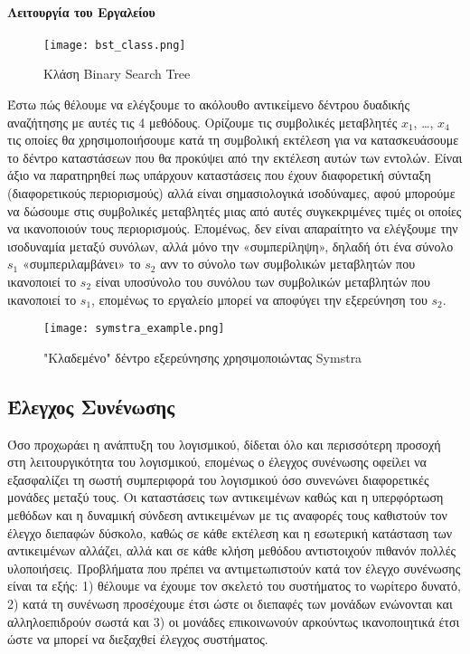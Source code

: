 \documentclass[12pt]{article}
\begin{document}
\paragraph{Λειτουργία του Εργαλείου}

\begin{wrapfigure}{r}{0.45\textwidth}
\centering
    \texttt{[image: bst\_class.png]}
    \caption{Κλάση Binary Search Tree}
    \label{fig:bst}
\end{wrapfigure}


Έστω πώς θέλουμε να ελέγξουμε το ακόλουθο αντικείμενο δέντρου δυαδικής αναζήτησης με αυτές τις 4 μεθόδους. Ορίζουμε τις συμβολικές μεταβλητές $x_1$, …, $x_4$ τις οποίες θα χρησιμοποιήσουμε κατά τη συμβολική εκτέλεση για να κατασκευάσουμε το δέντρο καταστάσεων που θα προκύψει από την εκτέλεση αυτών των εντολών. Είναι άξιο να παρατηρηθεί πως υπάρχουν καταστάσεις που έχουν διαφορετική σύνταξη (διαφορετικούς περιορισμούς) αλλά είναι σημασιολογικά ισοδύναμες, αφού μπορούμε να δώσουμε στις συμβολικές μεταβλητές μιας από αυτές συγκεκριμένες τιμές οι οποίες να ικανοποιούν τους περιορισμούς. Επομένως, δεν είναι απαραίτητο να ελέγξουμε την ισοδυναμία μεταξύ συνόλων, αλλά μόνο την «συμπερίληψη», δηλαδή ότι ένα σύνολο $s_1$ «συμπεριλαμβάνει» το $s_2$ ανν το σύνολο των συμβολικών μεταβλητών που ικανοποιεί το $s_2$ είναι υποσύνολο του συνόλου των συμβολικών μεταβλητών που ικανοποιεί το $s_1$, επομένως το εργαλείο μπορεί να αποφύγει την εξερεύνηση του $s_2$.

\begin{figure}
\label{fig:symstra_example}
\caption{"Κλαδεμένο" δέντρο εξερεύνησης χρησιμοποιώντας Symstra}
\texttt{[image: symstra\_example.png]}
\end{figure}

\subsection{Έλεγχος Συνένωσης} 

Όσο προχωράει η ανάπτυξη του λογισμικού, δίδεται όλο και περισσότερη προσοχή στη λειτουργικότητα του λογισμικού, επομένως ο έλεγχος συνένωσης οφείλει να εξασφαλίζει τη σωστή συμπεριφορά του λογισμικού όσο συνενώνει διαφορετικές μονάδες μεταξύ τους. Οι καταστάσεις των αντικειμένων καθώς και η υπερφόρτωση μεθόδων και η δυναμική σύνδεση αντικειμένων με τις αναφορές τους καθιστούν τον έλεγχο διεπαφών δύσκολο, καθώς σε κάθε εκτέλεση και η εσωτερική κατάσταση των αντικειμένων αλλάζει, αλλά και σε κάθε κλήση μεθόδου αντιστοιχούν πιθανόν πολλές υλοποιήσεις.
Προβλήματα που πρέπει να αντιμετωπιστούν κατά τον έλεγχο συνένωσης είναι τα εξής: 1) θέλουμε να έχουμε τον σκελετό του συστήματος το νωρίτερο δυνατό, 2) κατά τη συνένωση προσέχουμε έτσι ώστε οι διεπαφές των μονάδων ενώνονται και αλληλοεπιδρούν σωστά και 3) οι μονάδες επικοινωνούν αρκούντως ικανοποιητικά έτσι ώστε να μπορεί να διεξαχθεί έλεγχος συστήματος.
\cite{bashir}
\end{document}
